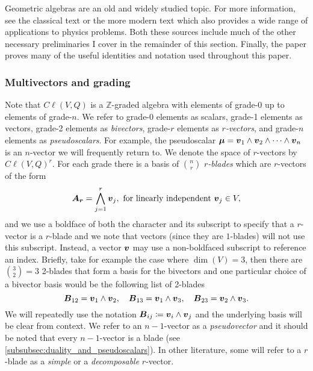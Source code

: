 Geometric algebras are an old and widely studied topic. For more information, see the classical text \cite{hestenes_clifford_1986} or the more modern text \cite{doran_geometric_2003} which also provides a wide range of applications to physics problems. Both these sources include much of the other necessary preliminaries I cover in the remainder of this section. Finally, the paper \cite{chisolm_geometric_2012} proves many of the useful identities and notation used throughout this paper.

\subsubsection{Multivectors and grading}
Note that $C\ell(V,Q)$ is a $\mathbb{Z}$-graded algebra with elements of grade-0 up to elements of grade-$n$. We refer to grade-0 elements as scalars, grade-1 elements as vectors, grade-2 elements as \emph{bivectors}, grade-$r$ elements as \emph{$r$-vectors}, and grade-$n$ elements as \emph{pseudoscalars}. For example, the pseudoscalar $\boldsymbol{\mu} = \boldsymbol{v}_1 \wedge \boldsymbol{v}_2 \wedge \cdots \wedge \boldsymbol{v}_n$ is an $n$-vector we will frequently return to. We denote the space of $r$-vectors by $C\ell(V,Q)^r$. For each grade there is a basis of ${n\choose r}$ \emph{$r$-blades} which are $r$-vectors of the form
\begin{equation}
\label{eq:blade}
\boldsymbol{A_r} = \bigwedge_{j=1}^r \boldsymbol{v}_j, ~\textrm{for linearly independent}~ \boldsymbol{v}_j \in V,
\end{equation}
and we use a boldface of both the character and its subscript to specify that a $r$-vector is a $r$-blade and we note that vectors (since they are $1$-blades) will not use this subscript. Instead, a vector $\boldsymbol{v}$ may use a non-boldfaced subscript to reference an index. Briefly, take for example the case where $\dim(V)=3$, then there are ${3\choose 2}=3$ 2-blades that form a basis for the bivectors and one particular choice of a bivector basis would be the following list of 2-blades
\begin{equation}
\label{eq:3_dim_basis}
\boldsymbol{B}_{12} = \boldsymbol{v}_1 \wedge \boldsymbol{v}_2, \quad \boldsymbol{B}_{13} = \boldsymbol{v}_1 \wedge \boldsymbol{v}_3, \quad \boldsymbol{B}_{23} = \boldsymbol{v}_2 \wedge \boldsymbol{v}_3.
\end{equation}
We will repeatedly use the notation $\boldsymbol{B}_{ij} \coloneqq \boldsymbol{v}_i\wedge \boldsymbol{v}_j$ and the underlying basis will be clear from context. We refer to an $n-1$-vector as a \emph{pseudovector} and it should be noted that every $n-1$-vector is a blade (see \cref{subsubsec:duality_and_pseudoscalars}). In other literature, some will refer to a $r$-blade as a \emph{simple} or a \emph{decomposable} $r$-vector. 

